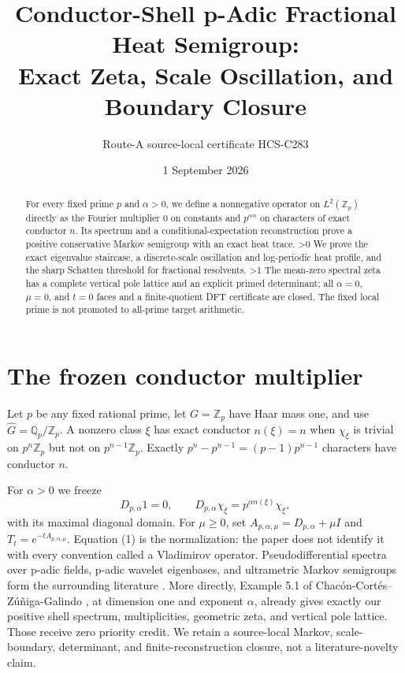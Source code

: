 \documentclass[10pt]{article}
\title{Conductor-Shell p-Adic Fractional Heat Semigroup:\\
Exact Zeta, Scale Oscillation, and Boundary Closure}
\author{Route-A source-local certificate HCS-C283}
\date{1 September 2026}
\providecommand{\CRevisionRound}{2}
\newcommand{\Zp}{\mathbb Z_p}
\newcommand{\Qp}{\mathbb Q_p}
\begin{document}
\maketitle
\begin{abstract}
For every fixed prime $p$ and $\alpha>0$, we define a nonnegative operator on
$L^2(\Zp)$ directly as the Fourier multiplier $0$ on constants and
$p^{\alpha n}$ on characters of exact conductor $n$.  Its spectrum and a
conditional-expectation reconstruction prove a positive conservative Markov
semigroup with an exact heat trace.
\ifnum\CRevisionRound>0 We prove the exact eigenvalue staircase, a
discrete-scale oscillation and log-periodic heat profile, and the sharp
Schatten threshold for fractional resolvents.\fi\space
\ifnum\CRevisionRound>1 The mean-zero spectral zeta has a complete vertical
pole lattice and an explicit primed determinant; all $\alpha=0$, $\mu=0$, and
$t=0$ faces and a finite-quotient DFT certificate are closed.\fi\space
The fixed local prime is not promoted to all-prime target arithmetic.
\end{abstract}

\section{The frozen conductor multiplier}
Let $p$ be any fixed rational prime, let $G=\Zp$ have Haar mass one, and use
$\widehat G=\Qp/\Zp$.  A nonzero class $\xi$ has exact conductor $n(\xi)=n$
when $\chi_\xi$ is trivial on $p^n\Zp$ but not on $p^{n-1}\Zp$.  Exactly
$p^n-p^{n-1}=(p-1)p^{n-1}$ characters have conductor $n$.

For $\alpha>0$ we freeze
\begin{equation}
 D_{p,\alpha}1=0,\qquad
 D_{p,\alpha}\chi_\xi=p^{\alpha n(\xi)}\chi_\xi,             \tag{1}
\end{equation}
with its maximal diagonal domain.  For $\mu\geq0$, set
$A_{p,\alpha,\mu}=D_{p,\alpha}+\mu I$ and
$T_t=e^{-tA_{p,\alpha,\mu}}$.  Equation (1) is the normalization: the paper
does not identify it with every convention called a Vladimirov operator.
Pseudodifferential spectra over p-adic fields, p-adic wavelet eigenbases, and
ultrametric Markov semigroups form the surrounding literature
\cite{Vlad,Kozyrev,BGPW,VVZ}.  More directly, Example 5.1 of
Chac\'on-Cort\'es--Z\'u\~niga-Galindo \cite{CZ}, at dimension one and exponent
$\alpha$, already gives exactly our positive shell spectrum, multiplicities,
geometric zeta, and vertical pole lattice.  Those receive zero priority
credit.  We retain a source-local Markov, scale-boundary, determinant, and
finite-reconstruction closure, not a literature-novelty claim.
\end{document}
